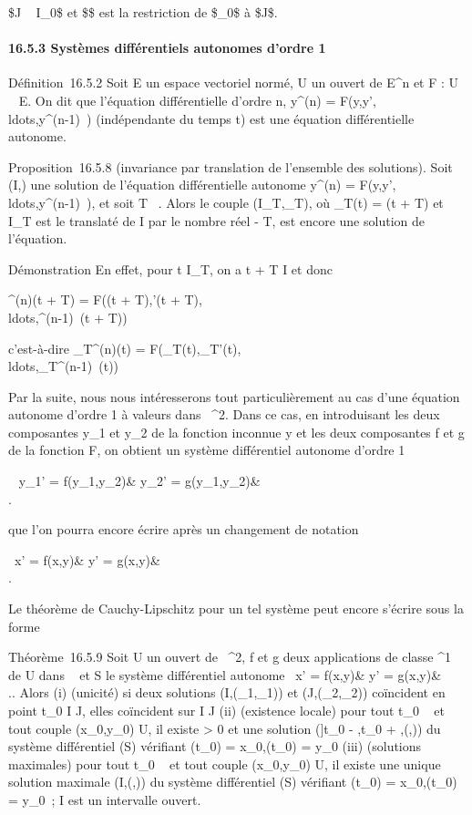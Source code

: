 \text\$J \subset~ I_0\$ et \$\psi\$ est la restriction
de \$\phi_0\$ à \$J\$.

\paragraph{16.5.3 Systèmes différentiels autonomes d'ordre 1}

Définition~16.5.2 Soit E un espace vectoriel normé, U un ouvert de
E^n et F : U \rightarrow~ E. On dit que l'équation différentielle
d'ordre n, y^(n) =
F(y,y',\\ldots,y^(n-1)~)
(indépendante du temps t) est une équation différentielle autonome.

Proposition~16.5.8 (invariance par translation de l'ensemble des
solutions). Soit (I,\phi) une solution de l'équation différentielle
autonome y^(n) =
F(y,y',\\ldots,y^(n-1)~),
et soit T \in {}~. Alors le couple (I_T,\phi_T), où
\phi_T(t) = \phi(t + T) et I_T est le translaté de I par le
nombre réel - T, est encore une solution de l'équation.

Démonstration En effet, pour t \in I_T, on a t + T \in I et donc

\phi^(n)(t + T) = F(\phi(t + T),\phi'(t +
T),\\ldots,\phi^(n-1)~(t
+ T))

c'est-à-dire \phi_T^(n)(t) =
F(\phi_T(t),\phi_T'(t),\\ldots,\phi_T^(n-1)~(t))

Par la suite, nous nous intéresserons tout particulièrement au cas d'une
équation autonome d'ordre 1 à valeurs dans ~^2. Dans ce cas,
en introduisant les deux composantes y_1 et y_2 de la
fonction inconnue y et les deux composantes f et g de la fonction F, on
obtient un système différentiel autonome d'ordre 1

\left \ \cases
y_1' = f(y_1,y_2)& \cr
y_2' = g(y_1,y_2)&\\ 
\right .

que l'on pourra encore écrire après un changement de notation

\left \ \cases x' =
f(x,y)& \cr y' = g(x,y)&\\  \right .

Le théorème de Cauchy-Lipschitz pour un tel système peut encore s'écrire
sous la forme

Théorème~16.5.9 Soit U un ouvert de ~^2, f et g deux
applications de classe ^1 de U dans ~ et S le système
différentiel autonome \left \
\cases x' = f(x,y)& \cr y' = g(x,y)&\\
 \right .. Alors (i) (unicité) si deux solutions
(I,(\phi_1,\psi_1)) et (J,(\phi_2,\psi_2))
coïncident en point t_0 \in I \bigcap J, elles coïncident sur I \bigcap J
(ii) (existence locale) pour tout t_0 \in \mathbb{R}~ et tout couple
(x_0,y_0) \in U, il existe \eta \textgreater{} 0 et une
solution ({]}t_0 - \eta,t_0 + \eta{[},(\phi,\psi)) du système
différentiel (S) vérifiant \phi(t_0) =
x_0,\psi(t_0) = y_0 (iii) (solutions maximales)
pour tout t_0 \in {}~ et tout couple (x_0,y_0) \in
U, il existe une unique solution maximale (I,(\phi,\psi)) du système
différentiel (S) vérifiant \phi(t_0) =
x_0,\psi(t_0) = y_0~; I est un intervalle
ouvert.

